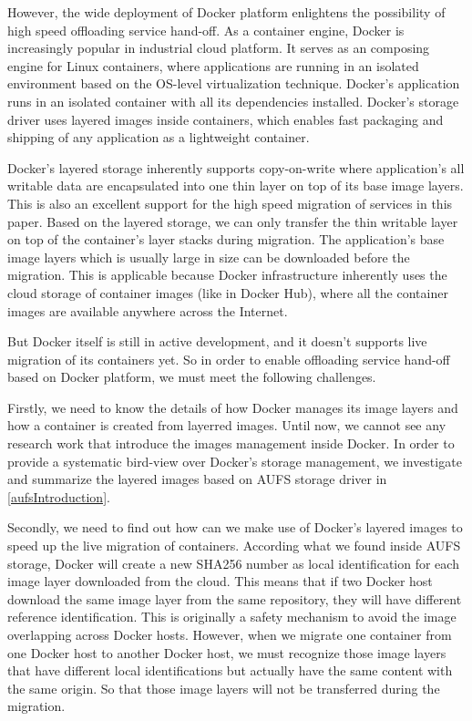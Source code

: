 However, the wide deployment of Docker platform enlightens the possibility of high speed offloading service hand-off. As a container engine, Docker is increasingly popular in industrial cloud platform. It serves as an composing engine for Linux containers, where applications are running in an isolated environment based on the OS-level virtualization technique.
Docker's application runs in an isolated container with all its dependencies installed. Docker's storage driver uses layered images inside containers, which enables fast packaging and shipping of any application as a lightweight container. 

Docker's layered storage inherently supports copy-on-write where application's all writable data are encapsulated into one thin layer on top of its base image layers. This is also an excellent support for the high speed migration of services in this paper. Based on the layered storage, we can only transfer the thin writable layer on top of the container's layer stacks during migration. The application's base image layers which is usually large in size can be downloaded before the migration. This is applicable because Docker infrastructure inherently uses the cloud storage of container images (like in Docker Hub\cite{dockerhub}), where all the container images are available anywhere across the Internet. 

But Docker itself is still in active development, and it doesn't supports live migration of its containers yet. So in order to enable offloading service hand-off based on Docker platform, we must meet the following challenges.

Firstly, we need to know the details of how Docker manages its image layers and how a container is created from layerred images. Until now, we cannot see any research work that introduce the images management inside Docker. In order to provide a systematic bird-view over Docker's storage management, we investigate and summarize the layered images based on AUFS storage driver in \ref{aufsIntroduction}.

Secondly, we need to find out how can we make use of Docker's layered images to speed up the live migration of containers. According what we found inside AUFS storage, Docker will create a new SHA256 number as local  identification for each image layer downloaded from the cloud. 
This means that if two Docker host download the same image layer from the same repository, they will have different reference identification. This is originally a safety mechanism to avoid the image overlapping across Docker hosts\cite{dockerlayer}. 
However, when we migrate one container from one Docker host to another Docker host, we must recognize those image layers that have different local identifications but actually have the same content with the same origin. So that those image layers will not be transferred during the migration.

